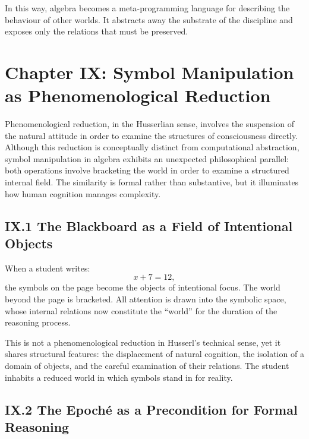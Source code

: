 \documentclass[11pt,letterpaper]{article}
\begin{document}
In this way, algebra becomes a meta-programming language for describing the behaviour of other worlds. It abstracts away the substrate of the discipline and exposes only the relations that must be preserved.

\newpage

\section{Chapter IX: Symbol Manipulation as Phenomenological Reduction}

Phenomenological reduction, in the Husserlian sense, involves the suspension of the natural attitude in order to examine the structures of consciousness directly. Although this reduction is conceptually distinct from computational abstraction, symbol manipulation in algebra exhibits an unexpected philosophical parallel: both operations involve bracketing the world in order to examine a structured internal field. The similarity is formal rather than substantive, but it illuminates how human cognition manages complexity.

\subsection{IX.1 The Blackboard as a Field of Intentional Objects}

When a student writes:
\[
x + 7 = 12,
\]
the symbols on the page become the objects of intentional focus. The world beyond the page is bracketed. All attention is drawn into the symbolic space, whose internal relations now constitute the ``world'' for the duration of the reasoning process.

This is not a phenomenological reduction in Husserl’s technical sense, yet it shares structural features: the displacement of natural cognition, the isolation of a domain of objects, and the careful examination of their relations. The student inhabits a reduced world in which symbols stand in for reality.

\subsection{IX.2 The Epoché as a Precondition for Formal Reasoning}
\end{document}
